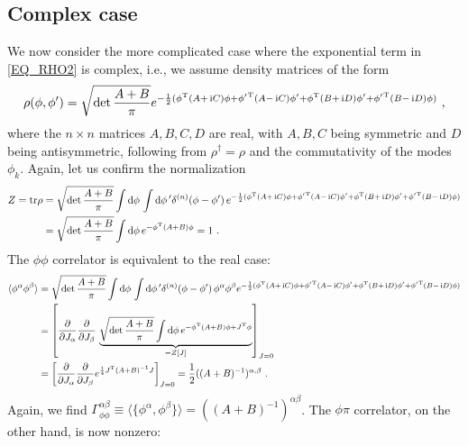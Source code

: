 \documentclass[letter]{article}
\newcommand{\intd}[1]{\int\mathrm{d}#1\,}
\begin{document}
\subsection{Complex case}
We now consider the more complicated case where the exponential term in \eqref{EQ_RHO2} is complex, i.e., we assume density matrices of the form
\begin{equation}
\rho(\phi, \phi^\prime) = \sqrt{\det\frac{A+B}{\pi}} e^{-\frac{1}{2} (\phi^\mathrm{T} (A+\,\mathrm{i} C) \phi + {\phi^\prime}^\mathrm{T} (A-\,\mathrm{i} C) \phi^\prime + \phi^\mathrm{T} (B+\,\mathrm{i} D) \phi^\prime + {\phi^\prime}^\mathrm{T} (B-\,\mathrm{i} D) \phi ) }\ ,
\end{equation}
where the $n\times n$ matrices $A,B,C,D$ are real, with $A,B,C$ being symmetric and $D$ being antisymmetric, following from $\rho^\dagger=\rho$ and the commutativity of the modes $\phi_k$. Again, let us confirm the normalization
\begin{align}
Z = \tr{\rho} &=  \sqrt{\det\frac{A+B}{\pi}} \intd\phi \intd\phi^\prime  \delta^{(n)}(\phi - \phi^\prime)\, e^{-\frac{1}{2} (\phi^\mathrm{T} (A+\i C) \phi + {\phi^\prime}^\mathrm{T} (A-\i C) \phi^\prime + \phi^\mathrm{T} (B+\i D) \phi^\prime  + {\phi^\prime}^\mathrm{T} (B-\i D) \phi) } \nonumber\\
&= \sqrt{\det\frac{A+B}{\pi}} \intd\phi e^{ -\phi^\mathrm{T} (A+B) \phi} 
= 1\ .
\end{align}
The $\phi\phi$ correlator is equivalent to the real case:
\begin{align}
\langle \phi^\alpha \phi^\beta \rangle &= \sqrt{\det\frac{A+B}{\pi}} \intd\phi \intd\phi^\prime  \delta^{(n)}(\phi - \phi^\prime)\, \phi^\alpha \phi^\beta e^{ -\frac{1}{2} (\phi^\mathrm{T} (A+\i C) \phi + {\phi^\prime}^\mathrm{T} (A-\i C) \phi^\prime + \phi^\mathrm{T} (B+\i D) \phi^\prime + {\phi^\prime}^\mathrm{T} (B-\i D) \phi ) } \nonumber\\
&= \left[ \frac{\partial}{\partial J_\alpha} \frac{\partial}{\partial J_\beta}\, 
\underbrace{\sqrt{\det\frac{A+B}{\pi}} \intd\phi  e^{ -\phi^\mathrm{T} (A+B) \phi + J^\mathrm{T} \phi }}_{= Z[J]} \right]_{J=0} \nonumber\\
&= \left[ \frac{\partial}{\partial J_\alpha} \frac{\partial}{\partial J_\beta} e^{\frac{1}{4} J^\mathrm{T} (A+B)^{-1} J} \right]_{J=0}  = \frac{1}{2} ((A+B)^{-1})^{\alpha,\beta}\ .
\end{align}
Again, we find $\Gamma^{\alpha\beta}_{\phi\phi} \equiv\langle \{ \phi^\alpha, \phi^\beta \} \rangle = ((A+B)^{-1})^{\alpha\beta}$. The $\phi\pi$ correlator, on the other hand, is now nonzero:
\end{document}
